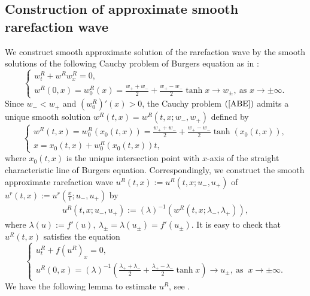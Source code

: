 \documentclass[10pt,reqno]{amsart}
\numberwithin{equation}{section}
\begin{document}
	\subsection{Construction of approximate smooth rarefaction wave}
	We construct smooth approximate solution of the rarefaction wave by the smooth solutions of the following Cauchy problem of Burgers equation as in \cite{ref24}:
	\begin{equation}\label{ABE}                 \left\{\begin{array}{l}w_{t}^{R}+w^{R} w_{x}^{R}=0, \\ w^{R}(0, x)=w_{0}^{R}(x)=\frac{w_{+}+w_{-}}{2}+\frac{w_{+}-w_{-}}{2} \tanh x \rightarrow w_{ \pm},\ \text {as } x \rightarrow \pm \infty .\end{array}\right. 
	\end{equation}
	Since $w_{-}<w_{+}$ and $\left(w_{0}^{R}\right)'(x)>0$, the Cauchy problem $(\ref{ABE})$ admits a unique smooth solution $w^{R}(t,x)=w^{R}(t,x;w_{-},w_{+})$ defined by
	\begin{equation}
		\left\{\begin{array}{l}w^{R}(t,x)=w_{0}^{R}\left(x_{0}(t,x)\right)=\frac{w_{+}+w_{-}}{2}+\frac{w_{+}-w_{-}}{2} \tanh \left(x_{0}(t, x)\right), \\ x=x_{0}(t,x)+w_{0}^{R}\left(x_{0}(t, x)\right) t,\end{array}\right.
	\end{equation}
	where $x_{0}(t,x)$ is the unique intersection point with $x$-axis of the straight characteristic line of Burgers equation. Correspondingly, we construct the smooth approximate rarefaction wave $u^{R}(t,x):=u^{R}(t,x;u_{-},u_{+})$ of $u^{r}(t,x):=u^{r}(\frac{x}{t};u_{-},u_{+})$ by
	\begin{align*}
		u^{R}(t,x;u_{-},u_{+}):=(\lambda)^{-1}\left(w^{R}(t,x;\lambda_{-},\lambda_{+})\right),
	\end{align*}
	where $\lambda(u):=f'(u),\ \lambda_{\pm}=\lambda(u_{\pm})=f'(u_{\pm})$. It is easy to check that $u^{R}(t,x)$ satisfies the equation
	\begin{equation}  \left\{\begin{array}{l}u_{t}^{R}+f\left(u^{R}\right)_{x}=0, \\ u^{R}(0, x)=(\lambda)^{-1}\left(\frac{\lambda_{+}+\lambda_{-}}{2}+\frac{\lambda_{+}-\lambda_{-}}{2} \tanh x\right) \rightarrow u_{ \pm}, \ \text {as }\  x \rightarrow \pm \infty .\end{array}\right. 
	\end{equation}
	We have the following lemma to estimate $u^{R}$, see \cite{ref16,ref24}.
\end{document}

